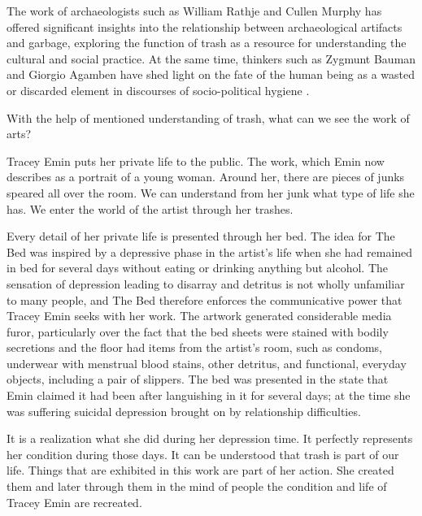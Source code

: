 The work of archaeologists such as William Rathje and Cullen Murphy has offered significant insights into the relationship between archaeological artifacts and garbage, exploring the function of trash as a resource for understanding the cultural and social practice. At the same time, thinkers such as Zygmunt Bauman and Giorgio Agamben have shed light on the fate of the human being as a wasted or discarded element in discourses of socio-political hygiene \citep{pye2010trashculture}. 

With the help of mentioned understanding of trash, what can we see the work of arts?


Tracey Emin puts her private life to the public. The work, which Emin now describes as a portrait of a young woman. Around her, there are pieces of junks speared all over the room. We can understand from her junk what type of life she has. We enter the world of the artist through her trashes.

Every detail of her private life is presented through her bed. The idea for The Bed was inspired by a depressive phase in the artist’s life when she had remained in bed for several days without eating or drinking anything but alcohol. The sensation of depression leading to disarray and detritus is not wholly unfamiliar to many people, and The Bed therefore enforces the communicative power that Tracey Emin seeks with her work. The artwork generated considerable media furor, particularly over the fact that the bed sheets were stained with bodily secretions and the floor had items from the artist's room, such as condoms, underwear with menstrual blood stains, other detritus, and functional, everyday objects, including a pair of slippers. The bed was presented in the state that Emin claimed it had been after languishing in it for several days; at the time she was suffering suicidal depression brought on by relationship difficulties.

It is a realization what she did during her depression time. It perfectly represents her condition during those days. It can be understood that trash is part of our life. Things that are exhibited in this work are part of her action. She created them and later through them in the mind of people the condition and life of Tracey Emin are recreated. 

